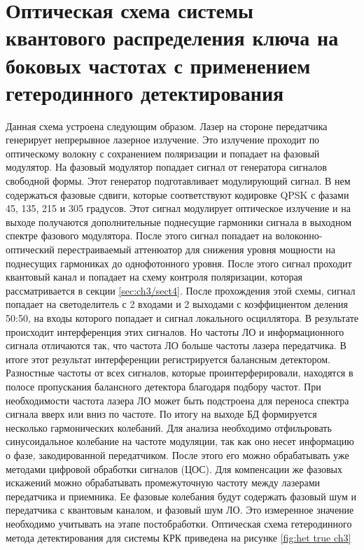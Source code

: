\section{Оптическая схема системы квантового распределения ключа на боковых частотах с применением гетеродинного детектирования }\label{sec:ch3/sect5}
Данная схема устроена следующим образом. Лазер на стороне передатчика генерирует непрерывное лазерное излучение. Это излучение проходит по оптическому волокну с сохранением поляризации  и попадает на фазовый модулятор. На фазовый модулятор попадает сигнал от генератора сигналов свободной формы. Этот генератор подготавливает модулирующий сигнал. В нем содержаться фазовые сдвиги, которые соответствуют кодировке QPSK  с фазами 45, 135, 215 и 305 градусов. Этот сигнал модулирует оптическое излучение и на выходе получаются дополнительные поднесущие гармоники сигнала в выходном спектре фазового модулятора. После этого сигнал попадает на волоконно-оптический перестраиваемый аттенюатор для снижения уровня мощности на поднесущих гармониках до однофотонного уровня.
После этого сигнал проходит квантовый канал и попадает на схему контроля поляризации, которая рассматривается в секции \ref{sec:ch3/sect4}. После прохождения этой схемы, сигнал попадает на светоделитель с 2 входами и 2 выходами с коэффициентом деления 50:50, на входы которого попадает и сигнал локального осциллятора. В результате происходит интерференция этих сигналов. Но частоты ЛО и информационного сигнала отличаются так, что частота ЛО больше частоты лазера передатчика. В итоге этот результат интерференции регистрируется балансным детектором. Разностные частоты от всех сигналов, которые проинтерферировали, находятся в полосе пропускания балансного детектора благодаря подбору частот. При необходимости частота лазера ЛО может быть подстроена для переноса спектра сигнала вверх или вниз по частоте. По итогу на выходе БД формируется несколько гармонических колебаний. Для анализа необходимо отфильровать синусоидальное колебание на частоте модуляции, так как оно несет информацию о фазе, закодированной передатчиком. После этого его можно обрабатывать уже методами цифровой обработки сигналов (ЦОС). Для компенсации же фазовых искажений можно обрабатывать промежуточную частоту между лазерами передатчика и  приемника. Ее фазовые колебания будут содержать фазовый шум и передатчика с квантовым каналом, и фазовый шум ЛО. Это измеренное значение необходимо учитывать на этапе постобработки. 
Оптическая схема гетеродинного метода детектирования для системы КРК приведена на рисунке \ref*{fig:het true ch3} 
